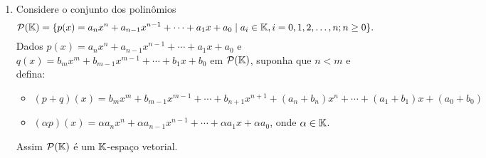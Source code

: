 \begin{exemplo}
\begin{enumerate}[label={\arabic*})]
		\item Considere o conjunto dos polin\^omios
		\[
			\mathcal{P}(\mathbb{K}) = \{ p(x) = a_nx^n + a_{n - 1}x^{n - 1} + \cdots + a_1x + a_0 \mid a_i \in \mathbb{K}, i = 0, 1, 2, \dots, n; n \ge 0 \}.
		\]
		Dados $p(x) = a_nx^n + a_{n - 1}x^{n - 1} + \cdots + a_1x + a_0$ e $q(x) = b_mx^m + b_{m - 1}x^{m - 1} + \cdots + b_1x + b_0$ em $\mathcal{P}(\mathbb{K})$, suponha que $n < m$ e defina:
		\begin{itemize}
			\item $(p + q)(x) = b_mx^m + b_{m - 1}x^{m - 1} + \cdots + b_{n + 1}x^{n + 1} + (a_n + b_n)x^n + \cdots + (a_1 + b_1)x + (a_0 + b_0)$
			\item $(\alpha p)(x) = \alpha a_nx^n + \alpha a_{n - 1}x^{n - 1} + \cdots + \alpha a_1x + \alpha a_0$, onde $\alpha \in \mathbb{K}$.
		\end{itemize}
		Assim $\mathcal{P}(\mathbb{K})$ \'e um $\mathbb{K}$-espa\c{c}o vetorial.


\end{enumerate}
\end{exemplo}
